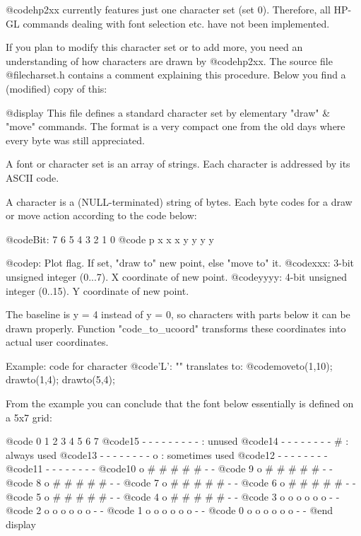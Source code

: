 @code{hp2xx} currently features just one character set (set 0).
Therefore, all HP-GL commands dealing with font selection etc.
have not been implemented.

If you plan to modify this character set or to add more,
you need an understanding of how characters are drawn by
@code{hp2xx}. The source file @file{charset.h} contains a comment
explaining this procedure. Below you find a (modified) copy of
this:

@display
 This file defines a standard character set by elementary
 "draw" & "move" commands. The format is a very compact one from
 the old days where every byte was still appreciated.

 A font or character set is an array of strings. Each character is
 addressed by its ASCII code.

 A character is a (NULL-terminated) string of bytes. Each byte
 codes for a draw or move action according to the code below:

     @code{Bit: 7 6 5 4 3 2 1 0}
     @code{     p x x x y y y y}

 @code{p:   } Plot flag. If set, "draw to" new point, else "move to" it.
 @code{xxx: } 3-bit unsigned integer  (0...7). X coordinate of new point.
 @code{yyyy:} 4-bit unsigned integer (0..15). Y coordinate of new point.

 The baseline is y = 4 instead of y = 0, so characters with parts
 below it can be drawn properly. Function "code_to_ucoord" transforms
 these coordinates into actual user coordinates.

 Example:  code for character @code{'L': ""} translates to:
           @code{moveto(1,10); drawto(1,4); drawto(5,4);}

 From the example you can conclude that the font below essentially is
 defined on a 5x7 grid:

     @code{    0 1 2 3 4 5 6 7}
     @code{15  - - - - - - - -     - : unused}
     @code{14  - - - - - - - -     # : always used}
     @code{13  - - - - - - - -     o : sometimes used}
     @code{12  - - - - - - - -}
     @code{11  - - - - - - - -}
     @code{10  o # # # # # - -}
     @code{ 9  o # # # # # - -}
     @code{ 8  o # # # # # - -}
     @code{ 7  o # # # # # - -}
     @code{ 6  o # # # # # - -}
     @code{ 5  o # # # # # - -}
     @code{ 4  o # # # # # - -}
     @code{ 3  o o o o o o - -}
     @code{ 2  o o o o o o - -}
     @code{ 1  o o o o o o - -}
     @code{ 0  o o o o o o - -}
@end display



